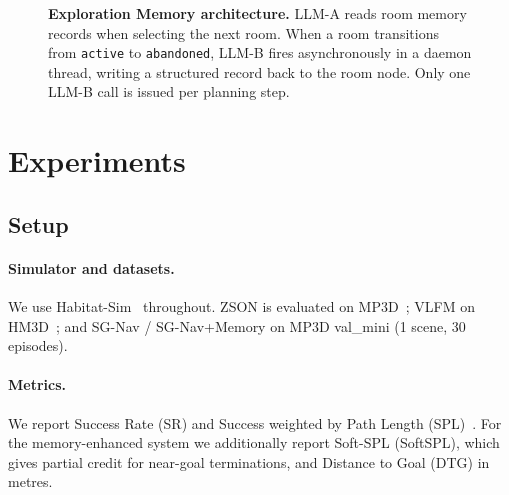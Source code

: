 \documentclass[10pt,twocolumn,letterpaper]{article}
\begin{document}
\begin{figure}[t]
\caption{
  \textbf{Exploration Memory architecture.}
  LLM-A reads room memory records when selecting the next room.
  When a room transitions from \texttt{active} to \texttt{abandoned},
  LLM-B fires asynchronously in a daemon thread, writing a structured
  record back to the room node.
  Only one LLM-B call is issued per planning step.
}
\label{fig:memory}
\end{figure}

\section{Experiments}
\label{sec:exp}

\subsection{Setup}

\paragraph{Simulator and datasets.}
We use Habitat-Sim~\cite{savva2019habitat} throughout.
ZSON is evaluated on MP3D~\cite{chang2017matterport3d};
VLFM on HM3D~\cite{ramakrishnan2021hm3d};
and SG-Nav / SG-Nav+Memory on MP3D val\_mini (1 scene, 30 episodes).

\paragraph{Metrics.}
We report Success Rate (SR) and Success weighted by Path Length
(SPL)~\cite{anderson2018evaluation}.
For the memory-enhanced system we additionally report Soft-SPL (SoftSPL),
which gives partial credit for near-goal terminations, and Distance to Goal
(DTG) in metres.
\end{document}
